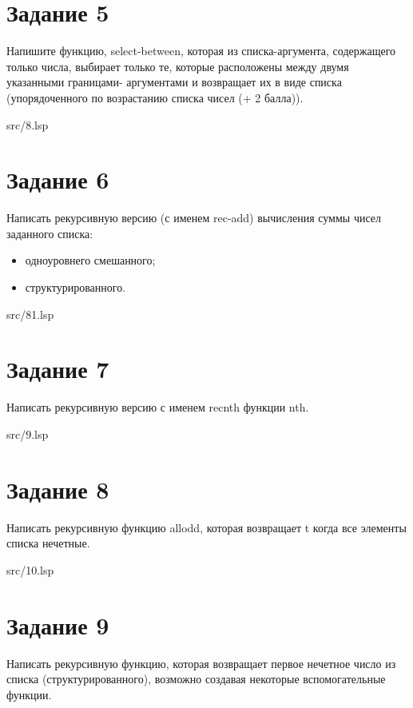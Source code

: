 \section*{Задание 5}
Напишите функцию, select-between, которая из списка-аргумента, содержащего только
числа, выбирает только те, которые расположены между двумя указанными границами-
аргументами и возвращает их в виде списка (упорядоченного по возрастанию списка чисел
(+ 2 балла)).

\FloatBarrier
\begin{lstinputlisting}[style={lsp}]{src/8.lsp}
\end{lstinputlisting}
\FloatBarrier

\section*{Задание 6}
Написать рекурсивную версию (с именем rec-add) вычисления суммы чисел заданного списка:

\begin{itemize}
	\item одноуровнего смешанного;
	\item структурированного.
\end{itemize}

\FloatBarrier
\begin{lstinputlisting}[style={lsp}]{src/81.lsp}
\end{lstinputlisting}
\FloatBarrier

\section*{Задание 7}
Написать рекурсивную версию с именем recnth функции nth.

\FloatBarrier
\begin{lstinputlisting}[style={lsp}]{src/9.lsp}
\end{lstinputlisting}
\FloatBarrier


\section*{Задание 8}
Написать рекурсивную функцию allodd, которая возвращает t когда все элементы списка
нечетные.

\FloatBarrier
\begin{lstinputlisting}[style={lsp}]{src/10.lsp}
\end{lstinputlisting}
\FloatBarrier


\section*{Задание 9}
Написать рекурсивную функцию, которая возвращает первое нечетное число из списка
(структурированного), возможно создавая некоторые вспомогательные функции.

